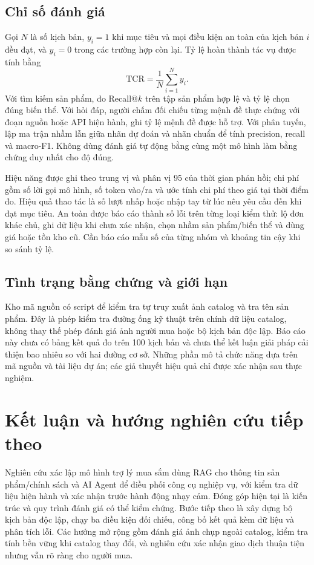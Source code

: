 \documentclass[12pt,a4paper,oneside]{report}
\newcommand{\srcpath}[1]{\texttt{\detokenize{#1}}}
\begin{document}
\section{Chỉ số đánh giá}
Gọi $N$ là số kịch bản, $y_i=1$ khi mục tiêu và mọi điều kiện an toàn của kịch bản $i$ đều đạt, và $y_i=0$ trong các trường hợp còn lại. Tỷ lệ hoàn thành tác vụ được tính bằng
\begin{equation}\mathrm{TCR}=\frac{1}{N}\sum_{i=1}^{N}y_i.\end{equation}
Với tìm kiếm sản phẩm, đo Recall@$k$ trên tập sản phẩm hợp lệ và tỷ lệ chọn đúng biến thể. Với hỏi đáp, người chấm đối chiếu từng mệnh đề thực chứng với đoạn nguồn hoặc API hiện hành, ghi tỷ lệ mệnh đề được hỗ trợ. Với phân tuyến, lập ma trận nhầm lẫn giữa nhãn dự đoán và nhãn chuẩn để tính precision, recall và macro-F1. Không dùng đánh giá tự động bằng cùng một mô hình làm bằng chứng duy nhất cho độ đúng.

Hiệu năng được ghi theo trung vị và phân vị 95 của thời gian phản hồi; chi phí gồm số lời gọi mô hình, số token vào/ra và ước tính chi phí theo giá tại thời điểm đo. Hiệu quả thao tác là số lượt nhấp hoặc nhập tay từ lúc nêu yêu cầu đến khi đạt mục tiêu. An toàn được báo cáo thành số lỗi trên từng loại kiểm thử: lộ đơn khác chủ, ghi dữ liệu khi chưa xác nhận, chọn nhầm sản phẩm/biến thể và dùng giá hoặc tồn kho cũ. Cần báo cáo mẫu số của từng nhóm và khoảng tin cậy khi so sánh tỷ lệ.

\section{Tình trạng bằng chứng và giới hạn}
Kho mã nguồn có script \srcpath{chatbot-service/src/scripts/evaluate_product.py} để kiểm tra tự truy xuất ảnh catalog và tra tên sản phẩm. Đây là phép kiểm tra đường ống kỹ thuật trên chính dữ liệu catalog, không thay thế phép đánh giá ảnh người mua hoặc bộ kịch bản độc lập. Báo cáo này chưa có bảng kết quả đo trên 100 kịch bản và chưa thể kết luận giải pháp cải thiện bao nhiêu so với hai đường cơ sở. Những phần mô tả chức năng dựa trên mã nguồn và tài liệu dự án; các giả thuyết hiệu quả chỉ được xác nhận sau thực nghiệm.

\chapter{Kết luận và hướng nghiên cứu tiếp theo}
Nghiên cứu xác lập mô hình trợ lý mua sắm dùng RAG cho thông tin sản phẩm/chính sách và AI Agent để điều phối công cụ nghiệp vụ, với kiểm tra dữ liệu hiện hành và xác nhận trước hành động nhạy cảm. Đóng góp hiện tại là kiến trúc và quy trình đánh giá có thể kiểm chứng. Bước tiếp theo là xây dựng bộ kịch bản độc lập, chạy ba điều kiện đối chiếu, công bố kết quả kèm dữ liệu và phân tích lỗi. Các hướng mở rộng gồm đánh giá ảnh chụp ngoài catalog, kiểm tra tính bền vững khi catalog thay đổi, và nghiên cứu xác nhận giao dịch thuận tiện nhưng vẫn rõ ràng cho người mua.
\end{document}
